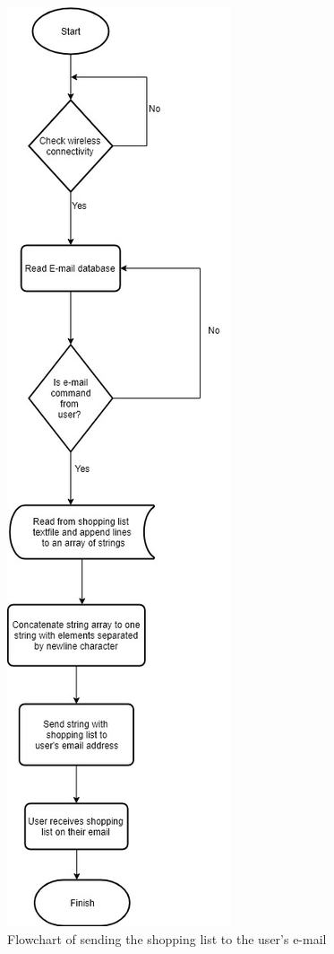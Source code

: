 \begin{figure}
	\centering
	\includegraphics[scale=0.5]{36.jpg}
	\caption{Flowchart of sending the shopping list to the user's e-mail}
\end{figure}
\clearpage
